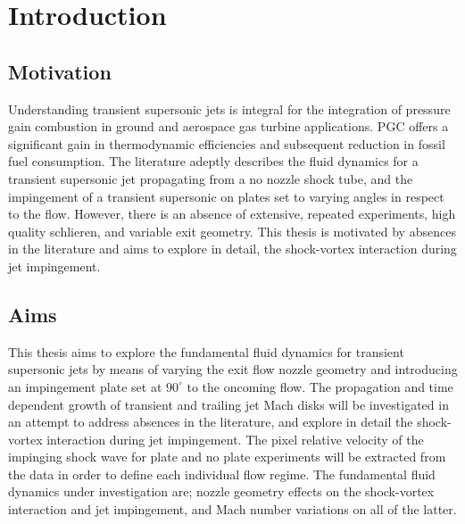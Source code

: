  


\newpage
{}
\section{Introduction} 

\subsection{Motivation}
Understanding transient supersonic jets is integral for the integration of pressure gain combustion in ground and aerospace gas turbine applications. PGC offers a significant gain in thermodynamic efficiencies and subsequent reduction in fossil fuel consumption. The literature adeptly describes the fluid dynamics for a transient supersonic jet propagating from a no nozzle shock tube, and the impingement of a transient supersonic on plates set to varying angles in respect to the flow. However, there is an absence of extensive, repeated experiments, high quality schlieren, and variable exit geometry. This thesis is motivated by absences in the literature and aims to explore in detail, the shock-vortex interaction during jet impingement.

\subsection{Aims}
This thesis aims to explore the fundamental fluid dynamics for transient supersonic jets by means of varying the exit flow nozzle geometry and introducing an impingement plate set at $90^{\circ}$ to the oncoming flow. The propagation and time dependent growth of transient and trailing jet Mach disks will be investigated in an attempt to address absences in the literature, and explore in detail the shock-vortex interaction during jet impingement. The pixel relative velocity of the impinging shock wave for plate and no plate experiments will be extracted from the data in order to define each individual flow regime. The fundamental fluid dynamics under investigation are; nozzle geometry effects on the shock-vortex interaction and jet impingement, and Mach number variations on all of the latter.


